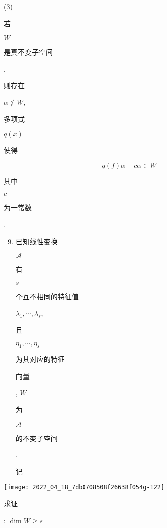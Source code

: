 \documentclass[10pt]{article}
\begin{document}
(3) \begin{CJK}{UTF8}{mj}若\end{CJK} $W$ \begin{CJK}{UTF8}{mj}是真不变子空间\end{CJK}, \begin{CJK}{UTF8}{mj}则存在\end{CJK} $\alpha \notin W$, \begin{CJK}{UTF8}{mj}多项式\end{CJK} $q(x)$ \begin{CJK}{UTF8}{mj}使得\end{CJK}
$$
q(f) \alpha-c \alpha \in W
$$
\begin{CJK}{UTF8}{mj}其中\end{CJK} $c$ \begin{CJK}{UTF8}{mj}为一常数\end{CJK}.

\begin{enumerate}
  \setcounter{enumi}{8}
  \item \begin{CJK}{UTF8}{mj}已知线性变换\end{CJK} $\mathscr{A}$ \begin{CJK}{UTF8}{mj}有\end{CJK} $s$ \begin{CJK}{UTF8}{mj}个互不相同的特征值\end{CJK} $\lambda_{1}, \cdots, \lambda_{s}$, \begin{CJK}{UTF8}{mj}且\end{CJK} $\eta_{1}, \cdots, \eta_{s}$ \begin{CJK}{UTF8}{mj}为其对应的特征\end{CJK} \begin{CJK}{UTF8}{mj}向量\end{CJK}, $W$ \begin{CJK}{UTF8}{mj}为\end{CJK} $\mathscr{A}$ \begin{CJK}{UTF8}{mj}的不变子空间\end{CJK}. \begin{CJK}{UTF8}{mj}记\end{CJK}
\end{enumerate}
\texttt{[image: 2022\_04\_18\_7db0708508f26638f054g-122]}

\begin{CJK}{UTF8}{mj}求证\end{CJK}: $\operatorname{dim} W \geqslant s$
\end{document}
